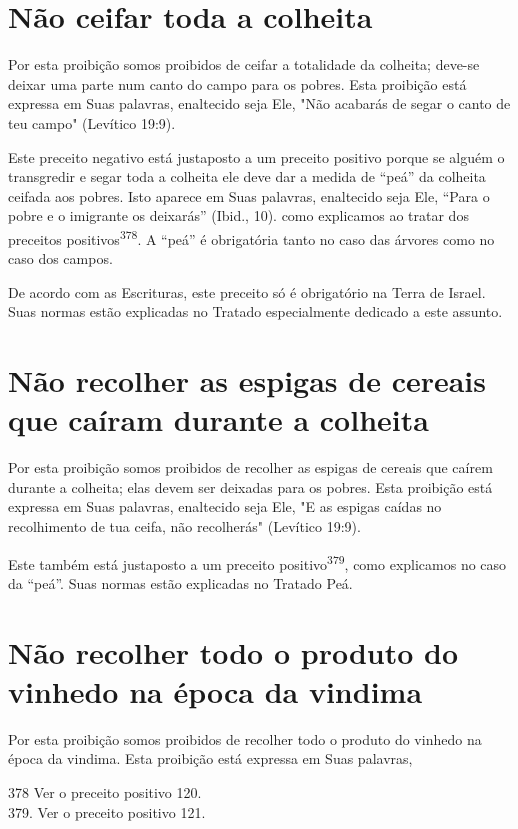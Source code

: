 \section{Não ceifar toda a colheita}

Por esta proibição somos proibidos de ceifar a totalidade da colhei­ta;
deve-se deixar uma parte num canto do campo para os pobres. Esta
proibi­ção está expressa em Suas palavras, enaltecido seja Ele, "Não
acabarás de segar o canto de teu campo" (Levítico 19:9).

Este preceito negativo está justaposto a um preceito positivo por­que se
alguém o transgredir e segar toda a colheita ele deve dar a medida de
``peá'' da colheita ceifada aos pobres. Isto aparece em Suas palavras,
enaltecido seja Ele, ``Para o pobre e o imigrante os deixarás'' (Ibid.,
10). como explicamos ao tratar dos preceitos
positivos\textsuperscript{378}. A ``peá'' é obrigatória tanto no caso das
árvores como no caso dos campos.

De acordo com as Escrituras, este preceito só é obrigatório na Terra de
Israel. Suas normas estão explicadas no Tratado especialmente dedicado a
este assunto.

\section{Não recolher as espigas de cereais que caíram durante a colheita}

Por esta proibição somos proibidos de recolher as espigas de cereais que
caírem durante a colheita; elas devem ser deixadas para os pobres. Esta
proi­bição está expressa em Suas palavras, enaltecido seja Ele, "E as
espigas caídas no recolhimento de tua ceifa, não recolherás" (Levítico
19:9).

Este também está justaposto a um preceito positivo\textsuperscript{379},
como expli­camos no caso da ``peá''. Suas normas estão explicadas no
Tratado Peá.

\section{Não recolher todo o produto do vinhedo na época da vindima}

Por esta proibição somos proibidos de recolher todo o produto do vinhedo
na época da vindima. Esta proibição está expressa em Suas palavras,


378 Ver o preceito positivo 120.\\
379. Ver o preceito positivo 121.



